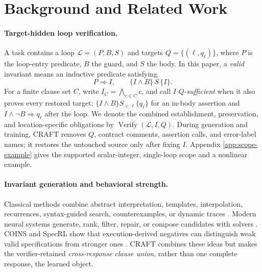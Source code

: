\section{Background and Related Work}
\label{sec:preliminaries}
\label{sec:related}

\paragraph{Target-hidden loop verification.}
A task contains a loop \(\mathcal L=(P,B,S)\) and targets
\(Q=\{(\ell,q_\ell)\}\), where \(P\) is the loop-entry predicate, \(B\) the
guard, and \(S\) the body.  In this paper, a \emph{valid} invariant means an
inductive predicate satisfying
\[
  P\Rightarrow I,\qquad \{I\wedge B\}\,S\,\{I\}.
\]
For a finite clause set \(C\), write \(I_C=\bigwedge_{c\in C}c\), and call
\(I\) \emph{\(Q\)-sufficient} when it also proves every restored target:
\(\{I\wedge B\}S_{<\ell}\{q_\ell\}\) for an in-body assertion and
\(I\wedge\neg B\Rightarrow q_\ell\) after the loop.  We denote the combined
establishment, preservation, and location-specific obligations by
\(\operatorname{Verify}(\mathcal L,I,Q)\).  During generation and training,
CRAFT removes \(Q\), contract comments, assertion calls, and error-label
names; it restores the untouched source only after fixing \(I\).  Appendix
\ref{app:scope-example} gives the supported scalar-integer, single-loop scope
and a nonlinear example.

\paragraph{Invariant generation and behavioral strength.}
Classical methods combine abstract interpretation, templates, interpolation,
recurrences, syntax-guided search, counterexamples, or dynamic traces
\citep{cousot1977abstract,karr1976affine,mcmillan2003interpolation,
kincaid2017compositional,alur2013sygus,garg2014ice,daikon}.  Modern neural
systems generate, rank, filter, repair, or compose candidates with solvers
\citep{si2020code2inv,kamath2023finding,chakraborty2023ranking,
cao2025clause2inv,wen2024enchanting,yang2026sespec}.  COINS and SpecRL show
that execution-derived negatives can distinguish weak valid specifications
from stronger ones \citep{yang2026coins,huang2026specrl}.  CRAFT combines
these ideas but makes the verifier-retained \emph{cross-response clause
union}, rather than one complete response, the learned object.


